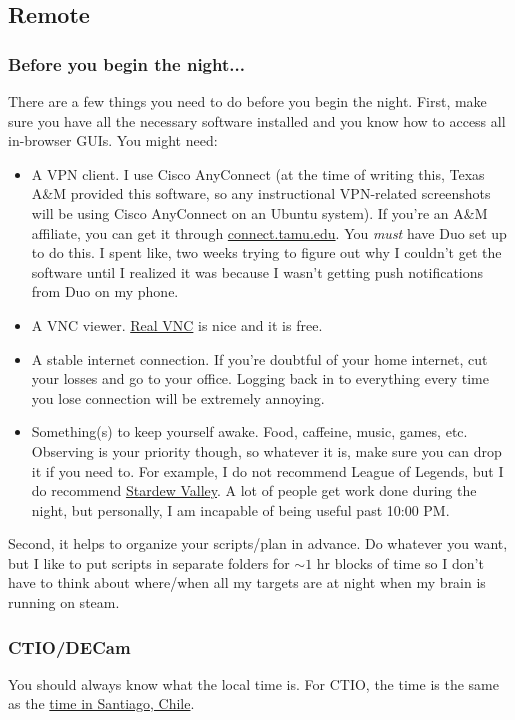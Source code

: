 \subsection{Remote}
\subsubsection{Before you begin the night...}
There are a few things you need to do before you begin the night. First, make sure you have all the necessary software installed and you know how to access all in-browser GUIs. You might need:
\begin{itemize}
    \item A VPN client. I use Cisco AnyConnect (at the time of writing this, Texas A\&M provided this software, so any instructional VPN-related screenshots will be using Cisco AnyConnect on an Ubuntu system). If you're an A\&M affiliate, you can get it through \href{connect.tamu.edu}{connect.tamu.edu}. You \textit{must} have Duo set up to do this. I spent like, two weeks trying to figure out why I couldn't get the software until I realized it was because I wasn't getting push notifications from Duo on my phone. 
    \item A VNC viewer. \href{https://www.realvnc.com/en/connect/download/viewer/}{Real VNC} is nice and it is free. 
    \item A stable internet connection. If you're doubtful of your home internet, cut your losses and go to your office. Logging back in to everything every time you lose connection will be extremely annoying. 
    \item Something(s) to keep yourself awake. Food, caffeine, music, games, etc. Observing is your priority though, so whatever it is, make sure you can drop it if you need to. For example, I do not recommend League of Legends, but I do recommend \href{https://www.stardewvalley.net/}{Stardew Valley}. A lot of people get work done during the night, but personally, I am incapable of being useful past 10:00 PM. 
\end{itemize}
\par
Second, it helps to organize your scripts/plan in advance. Do whatever you want, but I like to put scripts in separate folders for $\sim1$ hr blocks of time so I don't have to think about where/when all my targets are at night when my brain is running on steam. 

\subsubsection{CTIO/DECam}
\par
You should always know what the local time is. For CTIO, the time is the same as the \href{https://time.is/Santiago}{time in Santiago, Chile}. \\

